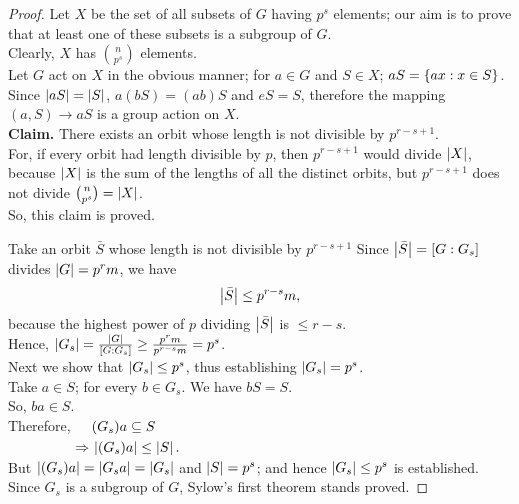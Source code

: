 \documentclass[../main-sheet.tex]{subfiles}
\begin{document}
    \begin{proof}
        Let \(X\) be the set of all subsets of \(G\) having \(p^s\) elements; our aim is to prove that at
        least one of these subsets is a subgroup of \(G\).\\
        Clearly, \(X\) has \(\binom{n}{p^s}\) elements.\\
        Let \(G\) act on \(X\) in the obvious manner; for \(a \in G\) and \(S \in X \); \(aS = \left\{ax: x \in S\right\}\).
        Since \(\left\vert aS\right\vert=\left\vert S\right\vert\), \(a( bS ) = ( ab )S\) and \(eS = S\),
        therefore the mapping \((a, S) \to aS\) is a group action on \(X\).\\
        \textbf{Claim.} There exists an orbit whose length is not divisible by \(p^{r-s+1}\).\\


        For, if every orbit had length divisible by \(p\), then \(p^{r-s+1}\) would divide \(\left\vert X\right\vert\),
        because \(\left\vert X\right\vert\) is the sum of the lengths of all the distinct orbits,
        but \(p^{r-s+1}\) does not divide \(\binom{n}{p^s}=\left\vert X\right\vert\).\\
        So, this claim is proved.


        Take an orbit \(\bar{S}\) whose length is not divisible by \(p^{r-s+1}\)
        Since \(\left\vert\bar{S}\right\vert= [G : G_s]\) divides \(\left\vert G\right\vert = p^rm\), we have
        \[\left\vert\bar{S}\right\vert \leq p^{r-s}m,\]
        because the highest power of \(p\) dividing \(\left\vert\bar{S}\right\vert\) is \(\leq r -s\).\\
        Hence, \(\left\vert G_s\right\vert=\frac{\left\vert G\right\vert}{[G:G_s]}\geq \frac{p^rm}{p^{r-s}m}=p^s\).\\
        Next we show that \(\left\vert G_s\right\vert \leq p^s\), thus establishing \(\left\vert G_s\right\vert= p^s\).\\
        Take \(a \in S\); for every \(b \in G_s\). We have \(bS = S\).\\
        So, \(ba \in S\).\\
        Therefore, \(\begin{aligned}[t]
            &(G_s)a \subseteq S\\
            \Rightarrow\,&\left\vert(G_s)a\right\vert \leq \left\vert S\right\vert.
        \end{aligned}\)\\
        But \(\left\vert(G_s)a\right\vert = \left\vert G_sa\right\vert = \left\vert G_s\right\vert\) and \(\left\vert S\right\vert = p^s\);
         and hence \(\left\vert G_s\right\vert \leq p^s\) is established.\\
        
        Since \(G_s\) is a subgroup of \(G\), Sylow's first theorem stands proved.
    \end{proof}
\end{document}
